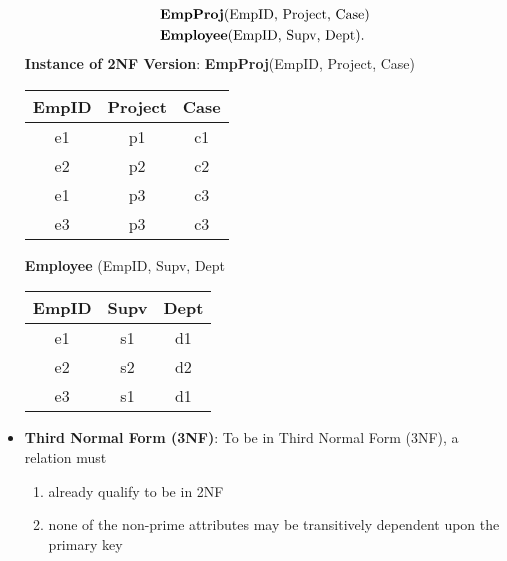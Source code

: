\documentclass{report}
\begin{document}
\begin{itemize}
            \bigbreak \noindent 
            \begin{align*}
                &\text{\textbf{EmpProj}(EmpID, Project, Case)} \\
                &\text{\textbf{Employee}(EmpID, Supv, Dept)}
            .\end{align*}
            \bigbreak \noindent 
            \textbf{Instance of 2NF Version}:
            \bigbreak \noindent 
            \textbf{EmpProj}(EmpID, Project, Case)                           
            \begin{center}
                \begin{tabular}{|c|c|c|}
                    \hline
                    EmpID & Project & Case \\ \hline
                    e1    & p1      & c1   \\ \hline
                    e2    & p2      & c2   \\ \hline
                    e1    & p3      & c3   \\ \hline
                    e3    & p3      & c3   \\ \hline
                \end{tabular}
            \end{center}
            \bigbreak \noindent 
            \textbf{Employee} (EmpID, Supv, Dept
            \bigbreak \noindent 
            \begin{center}
                \begin{tabular}{|c|c|c|}
                    \hline
                    EmpID & Supv & Dept \\ \hline
                    e1    & s1   & d1   \\ \hline
                    e2    & s2   & d2   \\ \hline
                    e3    & s1   & d1   \\ \hline
                \end{tabular}
            \end{center}
            \bigbreak \noindent 
        \item \textbf{Third Normal Form (3NF)}: To be in Third Normal Form (3NF), a relation must
            \begin{enumerate}
                \item already qualify to be in 2NF
                \item none of the non-prime attributes may be transitively dependent upon the primary key
            \end{enumerate}

\end{itemize}
\end{document}
